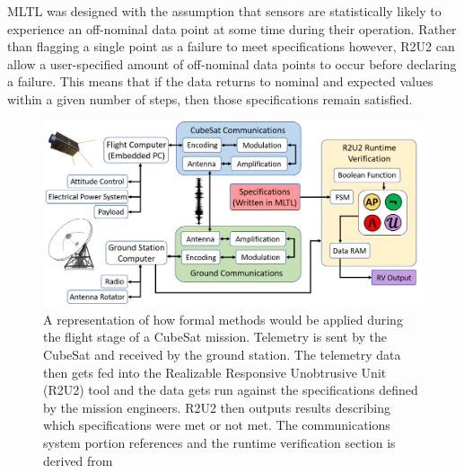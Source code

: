 \documentclass[conf]{new-aiaa}
\begin{document}
MLTL was designed with the assumption that sensors are statistically likely to experience an off-nominal data point at some time during their operation. Rather than flagging a single point as a failure to meet specifications however, R2U2 can allow a user-specified amount of off-nominal data points to occur before declaring a failure. This means that if the data returns to nominal and expected values within a given number of steps, then those specifications remain satisfied.

\begin{figure}[!ht]
\includegraphics[width=1.0\textwidth]{Fig/SciTech2.png}
\caption{A representation of how formal methods would be applied during the flight stage of a CubeSat mission. Telemetry is sent by the CubeSat and received by the ground station. The telemetry data then gets fed into the Realizable Responsive Unobtrusive Unit (R2U2) tool and the data gets run against the specifications defined by the mission engineers. R2U2 then outputs results describing which specifications were met or not met. The communications system portion references \cite{Asundi2013} and the runtime verification section is derived from}
\label{Diagram}
\end{figure}
\end{document}
